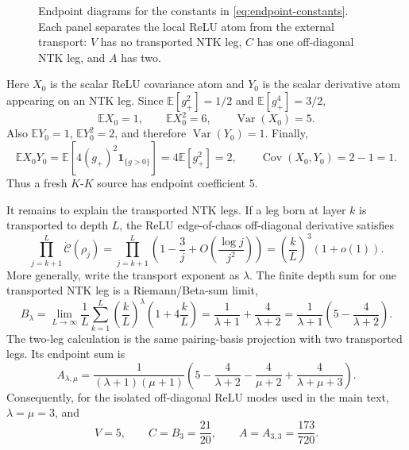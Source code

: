\documentclass{article}
\newcommand{\E}{\mathbb E}
\newcommand{\Cov}{\operatorname{Cov}}
\newcommand{\Var}{\operatorname{Var}}
\newcommand{\one}{\mathbf 1}
\begin{document}
\begin{figure}[H]
{
}
\caption{Endpoint diagrams for the constants in \eqref{eq:endpoint-constants}. Each panel separates the local ReLU atom from the external transport: \(V\) has no transported NTK leg, \(C\) has one off-diagonal NTK leg, and \(A\) has two.}
\label{fig:endpoint-constant-diagrams}
\end{figure}

Here \(X_0\) is the scalar ReLU covariance atom and \(Y_0\) is the scalar derivative atom appearing on an NTK leg. Since \(\E[g_+^2]=1/2\) and \(\E[g_+^4]=3/2\),
\[
\E X_0=1,
\qquad
\E X_0^2=6,
\qquad
\Var(X_0)=5.
\]
Also \(\E Y_0=1\), \(\E Y_0^2=2\), and therefore \(\Var(Y_0)=1\). Finally,
\[
\E X_0Y_0=\E\!\left[4(g_+)^2\one_{\{g>0\}}\right]=4\E[g_+^2]=2,
\qquad
\Cov(X_0,Y_0)=2-1=1.
\]
Thus a fresh \(K\)-\(K\) source has endpoint coefficient \(5\).

It remains to explain the transported NTK legs. If a leg born at layer \(k\) is transported to depth \(L\), the ReLU edge-of-chaos off-diagonal derivative satisfies
\[
\prod_{j=k+1}^{L}\dot{\mathcal C}(\rho_j)
=\prod_{j=k+1}^{L}\left(1-\frac3j+O\!\left(\frac{\log j}{j^2}\right)\right)
=\left(\frac{k}{L}\right)^3(1+o(1)).
\]
More generally, write the transport exponent as \(\lambda\). The finite depth sum for one transported NTK leg is a Riemann/Beta-sum limit,
\[
B_\lambda
=\lim_{L\to\infty}\frac1L\sum_{k=1}^{L}
\left(\frac{k}{L}\right)^\lambda
\left(1+4\frac{k}{L}\right)
=\frac{1}{\lambda+1}+\frac{4}{\lambda+2}
=\frac1{\lambda+1}\left(5-\frac4{\lambda+2}\right).
\]
The two-leg calculation is the same pairing-basis projection with two transported legs. Its endpoint sum is
\[
A_{\lambda,\mu}
=\frac{1}{(\lambda+1)(\mu+1)}
\left(5-\frac4{\lambda+2}-\frac4{\mu+2}
+\frac4{\lambda+\mu+3}\right).
\]
Consequently, for the isolated off-diagonal ReLU modes used in the main text, \(\lambda=\mu=3\), and
\[
V=5,
\qquad
C=B_3=\frac{21}{20},
\qquad
A=A_{3,3}=\frac{173}{720}.
\]
\end{document}
